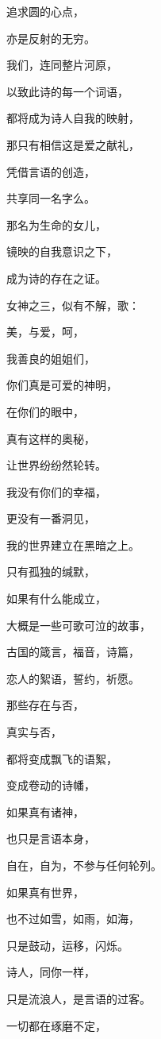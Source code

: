 \documentclass[UTF8]{article}
\begin{document}
\par 追求圆的心点，
\par 亦是反射的无穷。
\par 我们，连同整片河原，
\par 以致此诗的每一个词语，
\par 都将成为诗人自我的映射，
\par 那只有相信这是爱之献礼，
\par 凭借言语的创造，
\par 共享同一名字么。
\par 那名为生命的女儿，
\par 镜映的自我意识之下，
\par 成为诗的存在之证。
\\[0.6cm]
\par 女神之三，似有不解，歌：
\\[0.6cm]
\par 美，与爱，呵，
\par 我善良的姐姐们，
\par 你们真是可爱的神明，
\par 在你们的眼中，
\par 真有这样的奥秘，
\par 让世界纷纷然轮转。
\par 我没有你们的幸福，
\par 更没有一番洞见，
\par 我的世界建立在黑暗之上。
\par 只有孤独的缄默，
\par 如果有什么能成立，
\par 大概是一些可歌可泣的故事，
\par 古国的箴言，福音，诗篇，
\par 恋人的絮语，誓约，祈愿。
\par 那些存在与否，
\par 真实与否，
\par 都将变成飘飞的语絮，
\par 变成卷动的诗幡，
\par 如果真有诸神，
\par 也只是言语本身，
\par 自在，自为，不参与任何轮列。
\par 如果真有世界，
\par 也不过如雪，如雨，如海，
\par 只是鼓动，运移，闪烁。
\par 诗人，同你一样，
\par 只是流浪人，是言语的过客。
\par 一切都在琢磨不定，
\end{document}
